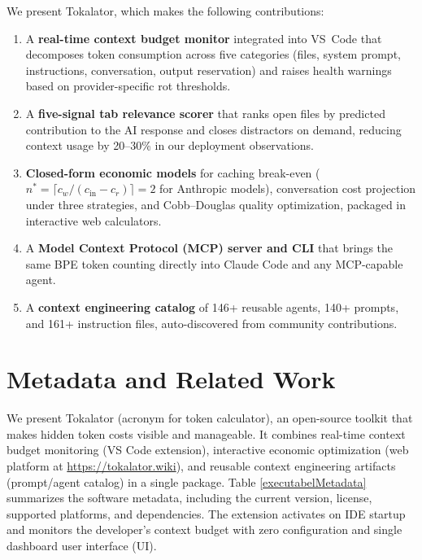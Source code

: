 \documentclass[a4paper,fleqn]{cas-dc}
\begin{document}
We present Tokalator, which makes the following contributions:
\begin{enumerate}
  \item A \textbf{real-time context budget monitor} integrated into VS~Code that decomposes token consumption across five categories (files, system prompt, instructions, conversation, output reservation) and raises health warnings based on provider-specific rot thresholds.
  \item A \textbf{five-signal tab relevance scorer} that ranks open files by predicted contribution to the AI response and closes distractors on demand, reducing context usage by 20–30\% in our deployment observations.
  \item \textbf{Closed-form economic models} for caching break-even ($n^* = \lceil c_w / (c_\mathrm{in} - c_r) \rceil = 2$ for Anthropic models), conversation cost projection under three strategies, and Cobb–Douglas quality optimization, packaged in interactive web calculators.
  \item A \textbf{Model Context Protocol (MCP) server and CLI} that brings the same BPE token counting directly into Claude Code and any MCP-capable agent.
  \item A \textbf{context engineering catalog} of 146+ reusable agents, 140+ prompts, and 161+ instruction files, auto-discovered from community contributions.
\end{enumerate}


\section{Metadata and Related Work}
\label{sec:metadata}

We present Tokalator (acronym for token calculator), an open-source toolkit that makes hidden token costs visible and manageable. It combines real-time context budget monitoring (VS Code extension), interactive economic optimization (web platform at \url{https://tokalator.wiki}), and reusable context engineering artifacts (prompt/agent catalog) in a single package. Table \ref{executabelMetadata} summarizes the software metadata, including the current version, license, supported platforms, and dependencies. The extension activates on IDE startup and monitors the developer's context budget with zero configuration and single dashboard user interface (UI).
\end{document}
